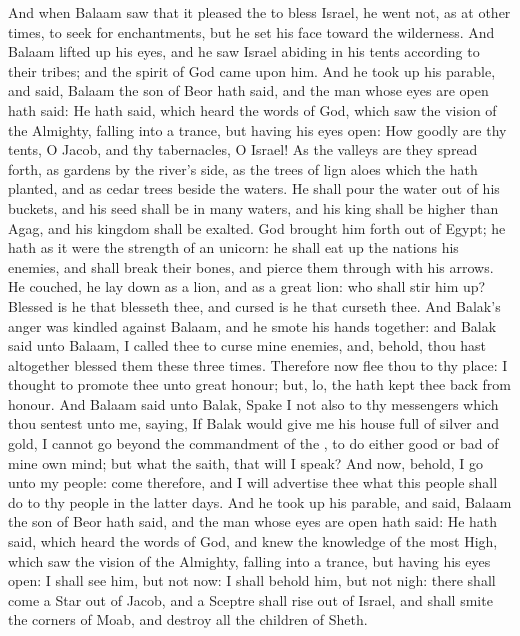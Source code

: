 \begin{biblechapter} %
\verse And when Balaam saw that it pleased the \LORD to bless Israel, he went not, as at other times, to seek for enchantments, but he set his face toward the wilderness.
\verse And Balaam lifted up his eyes, and he saw Israel abiding in his tents according to their tribes; and the spirit of God came upon him.
\verse And he took up his parable, and said, Balaam the son of Beor hath said, and the man whose eyes are open hath said:
\verse He hath said, which heard the words of God, which saw the vision of the Almighty, falling into a trance, but having his eyes open:
\verse How goodly are thy tents, O Jacob, and thy tabernacles, O Israel!
\verse As the valleys are they spread forth, as gardens by the river's side, as the trees of lign aloes which the \LORD hath planted, and as cedar trees beside the waters.
\verse He shall pour the water out of his buckets, and his seed shall be in many waters, and his king shall be higher than Agag, and his kingdom shall be exalted.
\verse God brought him forth out of Egypt; he hath as it were the strength of an unicorn: he shall eat up the nations his enemies, and shall break their bones, and pierce them through with his arrows.
\verse He couched, he lay down as a lion, and as a great lion: who shall stir him up? Blessed is he that blesseth thee, and cursed is he that curseth thee.
\verse And Balak's anger was kindled against Balaam, and he smote his hands together: and Balak said unto Balaam, I called thee to curse mine enemies, and, behold, thou hast altogether blessed them these three times.
\verse Therefore now flee thou to thy place: I thought to promote thee unto great honour; but, lo, the \LORD hath kept thee back from honour.
\verse And Balaam said unto Balak, Spake I not also to thy messengers which thou sentest unto me, saying,
\verse If Balak would give me his house full of silver and gold, I cannot go beyond the commandment of the \LORD, to do either good or bad of mine own mind; but what the \LORD saith, that will I speak?
\verse And now, behold, I go unto my people: come therefore, and I will advertise thee what this people shall do to thy people in the latter days.
 And he took up his parable, and said, Balaam the son of Beor hath said, and the man whose eyes are open hath said:
\verse He hath said, which heard the words of God, and knew the knowledge of the most High, which saw the vision of the Almighty, falling into a trance, but having his eyes open:
\verse I shall see him, but not now: I shall behold him, but not nigh: there shall come a Star out of Jacob, and a Sceptre shall rise out of Israel, and shall smite the corners of Moab, and destroy all the children of Sheth.

\end{biblechapter}
